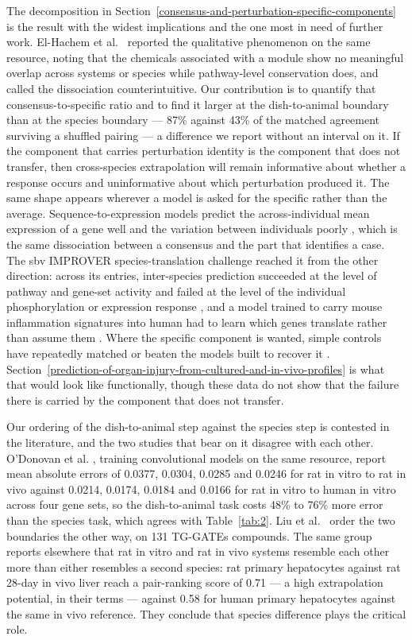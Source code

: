 \documentclass[11pt,a4paper]{article}
\begin{document}
The decomposition in Section~\ref{consensus-and-perturbation-specific-components} is the result with the widest
implications and the one most in need of further work. El-Hachem et
al.~\cite{ref14} reported the qualitative phenomenon on the same resource,
noting that the chemicals associated with a module show no meaningful
overlap across systems or species while pathway-level conservation does,
and called the dissociation counterintuitive. Our contribution is to
quantify that consensus-to-specific ratio and to find it larger at the
dish-to-animal boundary than at the species boundary --- 87\% against
43\% of the matched agreement surviving a shuffled pairing --- a
difference we report without an interval on it. If the component that
carries perturbation identity is the component that does not transfer,
then cross-species extrapolation will remain informative about whether a
response occurs and uninformative about which perturbation produced it.
The same shape appears wherever a model is asked for the specific rather
than the average. Sequence-to-expression models predict the
across-individual mean expression of a gene well and the variation
between individuals poorly \cite{ref47,ref48,ref49}, which is the same dissociation
between a consensus and the part that identifies a case. The sbv
IMPROVER species-translation challenge reached it from the other
direction: across its entries, inter-species prediction succeeded at the
level of pathway and gene-set activity and failed at the level of the
individual phosphorylation or expression response \cite{ref43,ref44,ref45}, and a
model trained to carry mouse inflammation signatures into human had to
learn which genes translate rather than assume them \cite{ref46}. Where the
specific component is wanted, simple controls have repeatedly matched or
beaten the models built to recover it \cite{ref50}. Section~\ref{prediction-of-organ-injury-from-cultured-and-in-vivo-profiles} is what that
would look like functionally, though these data do not show that the
failure there is carried by the component that does not transfer.

Our ordering of the dish-to-animal step against the species step is
contested in the literature, and the two studies that bear on it
disagree with each other. O'Donovan et al. \cite{ref20}, training
convolutional models on the same resource, report mean absolute errors
of 0.0377, 0.0304, 0.0285 and 0.0246 for rat in vitro to rat in vivo
against 0.0214, 0.0174, 0.0184 and 0.0166 for rat in vitro to human in
vitro across four gene sets, so the dish-to-animal task costs 48\% to
76\% more error than the species task, which agrees with Table~\ref{tab:2}. Liu et
al.~\cite{ref18} order the two boundaries the other way, on 131 TG-GATEs
compounds. The same group reports elsewhere \cite{ref19} that rat in vitro
and rat in vivo systems resemble each other more than either resembles a
second species: rat primary hepatocytes against rat 28-day in vivo liver
reach a pair-ranking score of 0.71 --- a high extrapolation potential,
in their terms --- against 0.58 for human primary hepatocytes against
the same in vivo reference. They conclude that species difference plays
the critical role.
\end{document}
